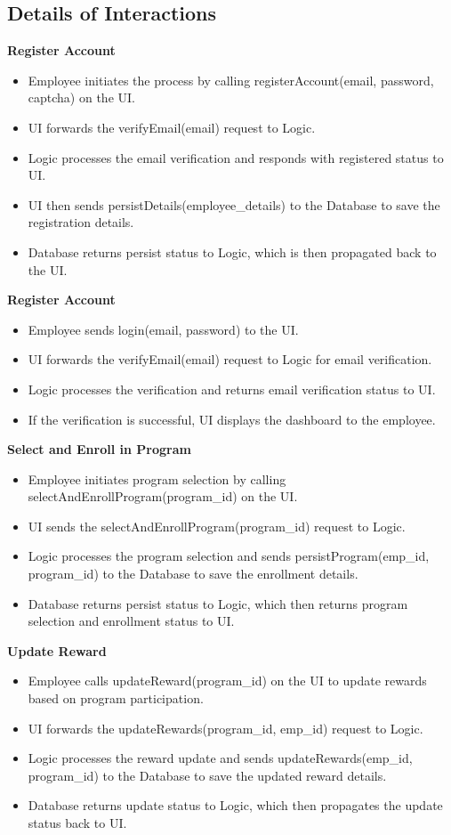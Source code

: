 \subsection{Details of Interactions}
\textbf{Register Account}
\begin{itemize}
    \item Employee initiates the process by calling registerAccount(email, password, captcha) on the UI. 
    \item UI forwards the verifyEmail(email) request to Logic. 
    \item Logic processes the email verification and responds with registered status to UI. 
    \item UI then sends persistDetails(employee\_details) to the Database to save the registration details. 
    \item Database returns persist status to Logic, which is then propagated back to the UI. 
\end{itemize}
\leavevmode
\newline
\textbf{Register Account}
\begin{itemize}
    \item Employee sends login(email, password) to the UI. 
    \item UI forwards the verifyEmail(email) request to Logic for email verification.
    \item Logic processes the verification and returns email verification status to UI. 
    \item If the verification is successful, UI displays the dashboard to the employee.
\end{itemize}
\leavevmode
\newline
\textbf{Select and Enroll in Program }
\begin{itemize}
    \item Employee initiates program selection by calling selectAndEnrollProgram(program\_id) on the UI. 
    \item UI sends the selectAndEnrollProgram(program\_id) request to Logic. 
    \item Logic processes the program selection and sends persistProgram(emp\_id, program\_id) to the Database to save the enrollment details.
    \item Database returns persist status to Logic, which then returns program selection and enrollment status to UI. 
\end{itemize}
\leavevmode
\newline
\textbf{Update Reward }
\begin{itemize}
    \item Employee calls updateReward(program\_id) on the UI to update rewards based on program participation. 
    \item UI forwards the updateRewards(program\_id, emp\_id) request to Logic. 
    \item Logic processes the reward update and sends updateRewards(emp\_id, program\_id) to the Database to save the updated reward details. 
    \item Database returns update status to Logic, which then propagates the update status back to UI. 
\end{itemize}

